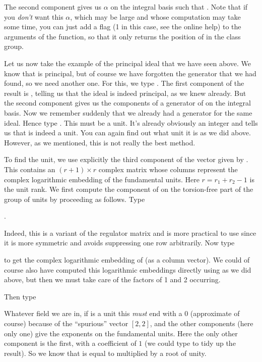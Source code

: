 The second component  gives us $\alpha$ on the integral basis
such that . Note that if you \emph{don't} want
this $\alpha$, which may be large and whose computation may take some time,
you can just add a flag (1 in this case, see the online help) to the
arguments of the  function, so that it only returns the
position of  in the class group. \smallskip

Let us now take the example of the principal ideal  that we have
seen above. We know that  is principal, but of course we have
forgotten the generator that we had found, so we need another one. For this,
we type . The first component of the result
is \kbd{[0]}, telling us that the ideal is indeed principal, as we knew
already. But the second component gives us the components of a generator of
 on the integral basis. Now we remember suddenly that we already had
a generator  for the same ideal. Hence type
. This must be a unit. It's already obviously an
integer and  tells us that  is indeed a unit.
You can again find out what unit it is as we did above. However, as we
mentioned, this is not really the best method.

To find the unit, we use explicitly the third component of the vector
 given by . This contains an $(r+1)\times r$ complex
matrix whose columns represent the complex logarithmic embedding of the
fundamental units. Here $r=r_1+r_2-1$ is the unit rank. We first compute
the component of  on the torsion-free part of the group of units
by proceeding as follows. Type

.

Indeed, this is a variant of the regulator matrix and is more practical to
use since it is more symmetric and avoids suppressing one row arbitrarily.
Now type


to get the complex logarithmic embedding of  (as a column vector). We
could of course also have computed this logarithmic embeddings directly using
 as we did above, but then we must take care of the factors of 1
and 2 occurring.

Then type 

Whatever field we are in, if  is a unit this \emph{must} end with a 0
(approximate of course) because of the ``spurious'' vector $[2,2]$, and the
other components (here only one) give the exponents on the fundamental units.
Here the only other component is the first, with a coefficient of $1$ (we
could type  to tidy up the result). So we know that  is
equal to  multiplied by a root of unity.

